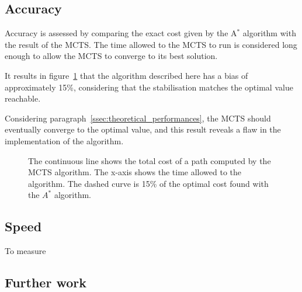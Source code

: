 \documentclass[oneside,twocolumn]{article}
\begin{document}
\subsection{Accuracy}
Accuracy is assessed by comparing the exact cost given by the A\(^*\) algorithm
with the result of the MCTS\@. The time allowed to the MCTS to run is considered
long enough to allow the MCTS to converge to its best solution.

It results in figure~\ref{fig:longterm} that the algorithm described here has a
bias of approximately 15\%, considering that the stabilisation matches the
optimal value reachable.

Considering paragraph~\ref{ssec:theoretical_performances}, the MCTS should
eventually converge to the optimal value, and this result reveals a flaw in the
implementation of the algorithm.
\begin{figure}
  \caption{The continuous line shows the total cost of a path computed by the
    MCTS algorithm. The x-axis shows the time allowed to the algorithm. The
    dashed curve is 15\% of the optimal cost found with the \(A^*\)
  algorithm.}\label{fig:longterm}
\end{figure}


\subsection{Speed}
To measure 

\subsection{Further work}



\end{document}
